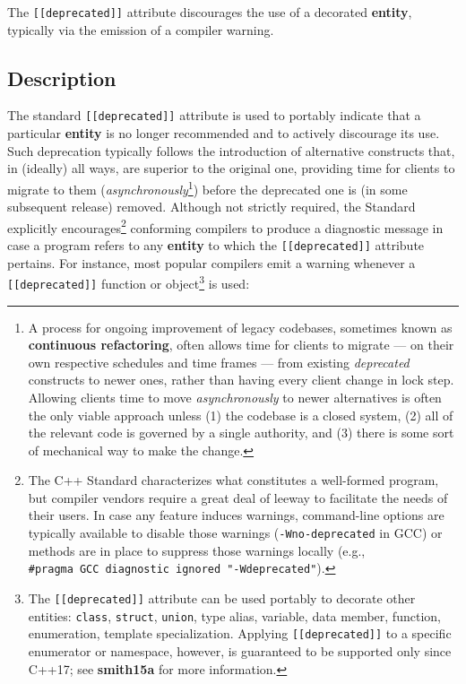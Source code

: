 \label{the-standard-[[deprecated]]-attribute}

The \texttt{[[deprecated]]} attribute discourages the use of a decorated
\textbf{entity}, typically via the emission of a compiler warning.

\subsection[Description]{Description}\label{description}

The standard \texttt{[[deprecated]]} attribute is used to portably
indicate that a particular \textbf{entity} is no longer recommended and
to actively discourage its use. Such deprecation typically follows the
introduction of alternative constructs that, in (ideally) all ways, are
superior to the original one, providing time for clients to migrate to
them (\emph{asynchronously}{\cprotect\footnote{A process for ongoing
improvement of legacy codebases, sometimes known as
\textbf{continuous refactoring}, often allows time for clients to
migrate --- on their own respective schedules and time frames --- from
existing \emph{deprecated} constructs to newer ones, rather than
having every client change in lock step. Allowing clients time to move
\emph{asynchronously} to newer alternatives is often the only viable
approach unless (1) the codebase is a closed system, (2) all of the
relevant code is governed by a single authority, and (3) there is some
  sort of mechanical way to make the change.}}) before the deprecated
one is (in some subsequent release) removed. Although not strictly
required, the Standard explicitly encourages{\cprotect\footnote{The C++
Standard characterizes what constitutes a well-formed program, but
compiler vendors require a great deal of leeway to facilitate the
needs of their users. In case any feature induces warnings,
command-line options are typically available to disable those warnings
(\texttt{-Wno-deprecated} in GCC) or methods are in place to suppress those warnings
locally (e.g.,
  \texttt{\#pragma}~\texttt{GCC}~\texttt{diagnostic}~\texttt{ignored}~\texttt{"-Wdeprecated"}).}}
conforming compilers to produce a diagnostic message in case a program
refers to any \textbf{entity} to which the \texttt{[[deprecated]]}
attribute pertains. For instance, most popular compilers emit a
warning whenever a \texttt{[[deprecated]]} function or
object{\cprotect\footnote{The \texttt{[[deprecated]]} attribute can be
used portably to decorate other entities: \texttt{class},
\texttt{struct}, \texttt{union}, type alias, variable, data member,
function, enumeration, template specialization. Applying
\texttt{[[deprecated]]} to a specific enumerator or namespace,
however, is guaranteed to be supported only since C++17; see
  \textbf{smith15a} for more information.}} is used:

